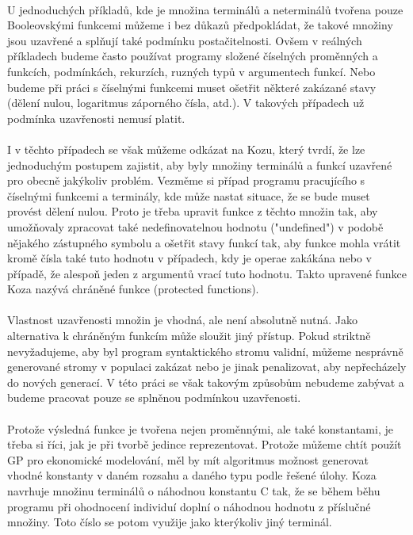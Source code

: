 \documentclass[bc,male,java,dept460]{diploma}		%
\begin{document}
\paragraph*{}
U jednoduchých příkladů, kde je množina terminálů a neterminálů tvořena pouze Booleovskými funkcemi můžeme i bez důkazů předpokládat, že takové množiny jsou uzavřené a splňují také podmínku postačitelnosti. Ovšem v reálných příkladech budeme často používat programy složené číselných proměnných a funkcích, podmínkách, rekurzích, ruzných typů v argumentech funkcí. Nebo budeme při práci s číselnými funkcemi muset ošetřit některé zakázané stavy (dělení nulou, logaritmus záporného čísla, atd.). V takových případech už podmínka uzavřenosti nemusí platit.

\paragraph*{}
I v těchto případech se však můžeme odkázat na Kozu, který tvrdí, že lze jednoduchým postupem zajistit, aby byly množiny terminálů a funkcí uzavřené pro obecně jakýkoliv problém. Vezměme si případ programu pracujícího s číselnými funkcemi a terminály, kde může nastat situace, že se bude muset provést dělení nulou. Proto je třeba upravit funkce z těchto množin tak, aby umožňovaly zpracovat také nedefinovatelnou hodnotu ("undefined") v podobě nějakého zástupného symbolu a ošetřit stavy funkcí tak, aby funkce mohla vrátit kromě čísla také tuto hodnotu v případech, kdy je operae zakákána nebo v případě, že alespoň jeden z argumentů vrací tuto hodnotu. Takto upravené funkce Koza nazývá chráněné funkce (protected functions).

\paragraph*{}
Vlastnost uzavřenosti množin je vhodná, ale není absolutně nutná. Jako alternativa k chráněným funkcím může sloužit jiný přístup. Pokud striktně nevyžadujeme, aby byl program syntaktického stromu validní, můžeme nesprávně generované stromy v populaci zakázat nebo je jinak penalizovat, aby nepřecházely do nových generací. V této práci se však takovým způsobům nebudeme zabývat a budeme pracovat pouze se splněnou podmínkou uzavřenosti.

\paragraph*{}
Protože výsledná funkce je tvořena nejen proměnnými, ale také konstantami, je třeba si říci, jak je při tvorbě jedince reprezentovat. Protože můžeme chtít použít GP pro ekonomické modelování, měl by mít algoritmus možnost generovat vhodné konstanty v daném rozsahu a daného typu podle řešené úlohy. Koza navrhuje množinu terminálů o náhodnou konstantu C tak, že se během běhu programu při ohodnocení individuí doplní o náhodnou hodnotu z příslučné množiny. Toto číslo se potom využije jako kterýkoliv jiný terminál.
\end{document}
